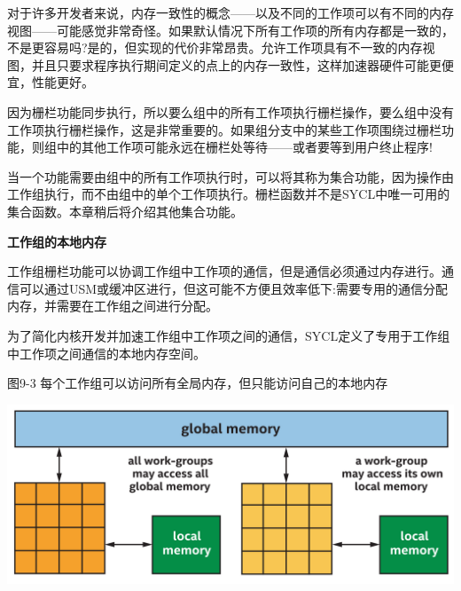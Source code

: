 \begin{tcolorbox}[colback=blue!5!white,colframe=blue!75!black, title=为什么内存在默认情况下不一致?]
对于许多开发者来说，内存一致性的概念——以及不同的工作项可以有不同的内存视图——可能感觉非常奇怪。如果默认情况下所有工作项的所有内存都是一致的，不是更容易吗?是的，但实现的代价非常昂贵。允许工作项具有不一致的内存视图，并且只要求程序执行期间定义的点上的内存一致性，这样加速器硬件可能更便宜，性能更好。
\end{tcolorbox}

因为栅栏功能同步执行，所以要么组中的所有工作项执行栅栏操作，要么组中没有工作项执行栅栏操作，这是非常重要的。如果组分支中的某些工作项围绕过栅栏功能，则组中的其他工作项可能永远在栅栏处等待——或者要等到用户终止程序!\par

\begin{tcolorbox}[colback=blue!5!white,colframe=blue!75!black, title=集合功能]
当一个功能需要由组中的所有工作项执行时，可以将其称为集合功能，因为操作由工作组执行，而不由组中的单个工作项执行。栅栏函数并不是SYCL中唯一可用的集合函数。本章稍后将介绍其他集合功能。
\end{tcolorbox}

\hspace*{\fill} \par %
\textbf{工作组的本地内存}

工作组栅栏功能可以协调工作组中工作项的通信，但是通信必须通过内存进行。通信可以通过USM或缓冲区进行，但这可能不方便且效率低下:需要专用的通信分配内存，并需要在工作组之间进行分配。\par

为了简化内核开发并加速工作组中工作项之间的通信，SYCL定义了专用于工作组中工作项之间通信的本地内存空间。\par

\hspace*{\fill} \par %
图9-3 每个工作组可以访问所有全局内存，但只能访问自己的本地内存
\begin{center}
	\includegraphics[width=1.\textwidth]{content/chapter-9/images/4}
\end{center}

